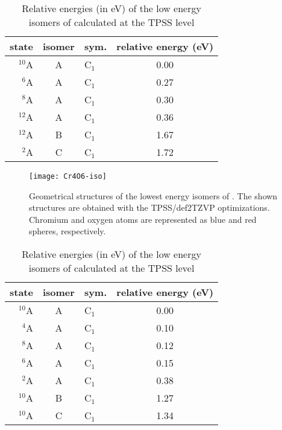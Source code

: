 \newpage


\begin{table}[]
	\centering
	\caption{Relative energies (in eV) of the low energy isomers of  calculated at the TPSS level}
	\begin{tabular}{@{}rclc@{}}
	\toprule
	state & isomer & sym. & relative energy (eV) \\ \midrule
	$^{10}$A   & A      & C$_1$   & 0.00                 \\
	$^6$A      & A      & C$_1$   & 0.27                 \\
	$^8$A      & A      & C$_1$   & 0.30                 \\
	$^{12}$A   & A      & C$_1$   & 0.36                 \\
	$^{12}$A   & B      & C$_1$   & 1.67                 \\
	$^2$A      & C      & C$_1$   & 1.72                 \\ \bottomrule
	\end{tabular}
\end{table}


\begin{figure}
	\centering
	\texttt{[image: Cr4O6-iso]}
	\caption{Geometrical structures of the lowest energy isomers of . The shown structures are obtained with the TPSS/def2TZVP optimizations. Chromium and oxygen atoms are represented as blue and red spheres, respectively.}
	\label{figs:Cr4O6}
\end{figure}




\begin{table}[]
	\centering
	\caption{Relative energies (in eV) of the low energy isomers of  calculated at the TPSS level}
	\begin{tabular}{@{}rclc@{}}
	\toprule
		state  & isomer & sym. 	  & relative energy (eV) \\ \midrule
	$^{10}$A   & A      & C$_1$   & 0.00                 \\
	$^4$A      & A      & C$_1$   & 0.10                 \\
	$^8$A      & A      & C$_1$   & 0.12                 \\
	$^6$A      & A      & C$_1$   & 0.15                 \\
	$^2$A      & A      & C$_1$   & 0.38                 \\
	$^{10}$A   & B      & C$_1$   & 1.27                 \\
	$^{10}$A   & C      & C$_1$   & 1.34                 \\ \bottomrule
	\end{tabular}
\end{table}



